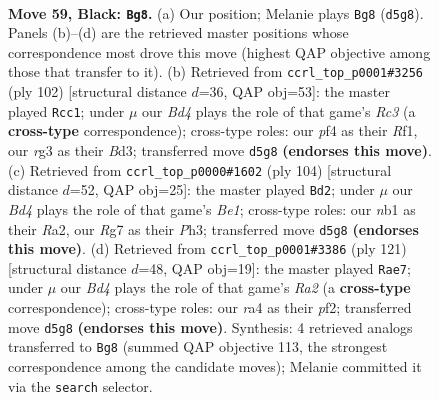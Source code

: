 \documentclass[11pt]{article}
\begin{document}
\clearpage

\begin{figure}[p]\centering
\begin{subfigure}{0.46\textwidth}\centering
\resizebox{\linewidth}{!}{%
\newchessgame
\chessboard[
  setfen={1rk5/p1p3r1/P1p3p1/2Pb1p1p/RP3P1P/6R1/5K2/1N6 b - - 41 59},
  showmover=false,
  pgfstyle=straightmove, color=movearrow, markmove={d5-g8}
]}
\caption{}
\end{subfigure}\hfill
\begin{subfigure}{0.46\textwidth}\centering
\resizebox{\linewidth}{!}{%
\newchessgame
\chessboard[
  setfen={5r2/3k4/1p1nr1p1/p2p2Pp/P4P1P/1PRB4/1K6/5R2 w - - 8 52},
  showmover=false,
  pgfstyle=straightmove, color=movearrow, markmove={c3-c1}
]}
\caption{}
\end{subfigure}
\\[4pt]
\begin{subfigure}{0.46\textwidth}\centering
\resizebox{\linewidth}{!}{%
\newchessgame
\chessboard[
  setfen={2r5/p7/1p1bk1p1/1P1rp2p/P1p1R3/2P2P1P/R3K1P1/4B3 w - - 5 53},
  showmover=false,
  pgfstyle=straightmove, color=movearrow, markmove={e1-d2}
]}
\caption{}
\end{subfigure}\hfill
\begin{subfigure}{0.46\textwidth}\centering
\resizebox{\linewidth}{!}{%
\newchessgame
\chessboard[
  setfen={8/r4p2/2p1rk1p/p1Pp2pP/P2R4/2K1P1P1/5P2/1R6 b - - 58 61},
  showmover=false,
  pgfstyle=straightmove, color=movearrow, markmove={a7-e7}
]}
\caption{}
\end{subfigure}
\caption{\textbf{Move 59, Black: \texttt{Bg8}.} (a) Our position; Melanie plays \texttt{Bg8} (\texttt{d5g8}). Panels (b)--(d) are the retrieved master positions whose correspondence most drove this move (highest QAP objective among those that transfer to it). (b) Retrieved from \texttt{ccrl\_top\_p0001\#3256} (ply 102) [structural distance $d$=36, QAP obj=53]: the master played \texttt{Rcc1}; under $\mu$ our \emph{Bd4} plays the role of that game's \emph{Rc3} (a \textbf{cross-type} correspondence); cross-type roles: our \emph{p}f4 as their \emph{R}f1, our \emph{r}g3 as their \emph{B}d3; transferred move \texttt{d5g8} \textbf{(endorses this move)}. (c) Retrieved from \texttt{ccrl\_top\_p0000\#1602} (ply 104) [structural distance $d$=52, QAP obj=25]: the master played \texttt{Bd2}; under $\mu$ our \emph{Bd4} plays the role of that game's \emph{Be1}; cross-type roles: our \emph{n}b1 as their \emph{R}a2, our \emph{R}g7 as their \emph{P}h3; transferred move \texttt{d5g8} \textbf{(endorses this move)}. (d) Retrieved from \texttt{ccrl\_top\_p0001\#3386} (ply 121) [structural distance $d$=48, QAP obj=19]: the master played \texttt{Rae7}; under $\mu$ our \emph{Bd4} plays the role of that game's \emph{Ra2} (a \textbf{cross-type} correspondence); cross-type roles: our \emph{r}a4 as their \emph{p}f2; transferred move \texttt{d5g8} \textbf{(endorses this move)}. Synthesis: 4 retrieved analogs transferred to \texttt{Bg8} (summed QAP objective 113, the strongest correspondence among the candidate moves); Melanie committed it via the \texttt{search} selector.}
\label{fig:thought-m117}
\end{figure}
\end{document}
